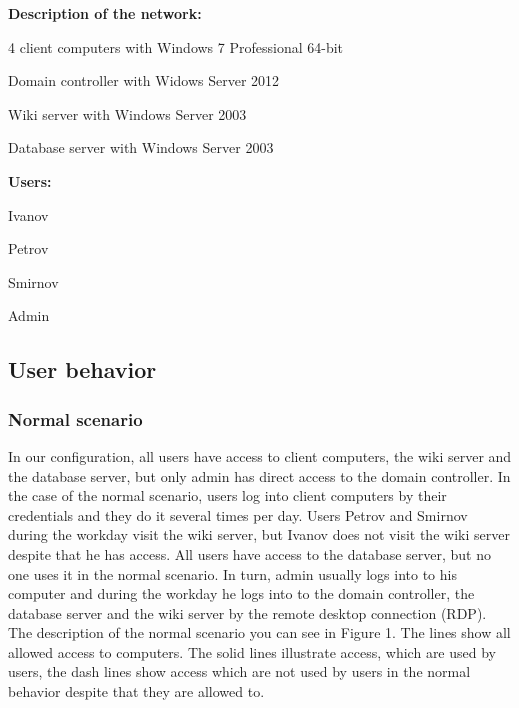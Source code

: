 \begin{compactitem}
\item [\textbf{Description of the network:}]
\item 4 client computers with Windows 7 Professional 64-bit
\item Domain controller with Widows Server 2012
\item Wiki server with Windows Server 2003
\item Database server with Windows Server 2003
\end{compactitem}

\begin{compactitem}
\item [\textbf{Users:}]
\item Ivanov
\item Petrov
\item Smirnov
\item Admin
\end{compactitem}
     
     
\subsection{User behavior}
\subsubsection{Normal scenario}
In our configuration, all users have access to client computers, the wiki server and the database server, but only admin has direct access to the domain controller. In the case of the normal scenario, users log into client computers by their credentials and they do it several times per day. Users Petrov and Smirnov during the workday visit the wiki server, but Ivanov does not visit the wiki server despite that he has access. All users have access to the database server, but no one uses it in the normal scenario. In turn, admin usually logs into to his computer and during the workday he logs into to the domain controller, the database server and the wiki server by the remote desktop connection (RDP). The description of the normal scenario you can see in Figure 1. The lines show all allowed access to computers. The solid lines illustrate access, which are used by users, the dash lines show access which are not used by users in the normal behavior despite that they are allowed to. 

